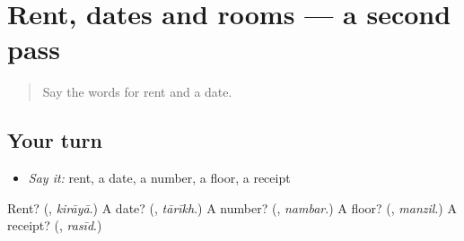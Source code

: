 \section[(dialogue)]{Rent, dates and rooms — a second pass}

\label{lesson:HI-R167-second-pass-rent-dates-and-rooms}



\begin{quote}
Say the words for rent and a date.
\end{quote}

\subsection*{Your turn}
\begin{itemize}
\raggedright
  \item \emph{Say it:} rent, a date, a number, a floor, a receipt
\end{itemize}

\begin{tcolorbox}[breakable,colback=teal!4,colframe=teal!35!black,title={Before you move on}]
Rent? (\textbf{}, \emph{kirāyā}.) A date? (\textbf{}, \emph{tārīkh}.) A number? (\textbf{}, \emph{nambar}.) A floor? (\textbf{}, \emph{manzil}.) A receipt? (\textbf{}, \emph{rasīd}.)
\end{tcolorbox}
